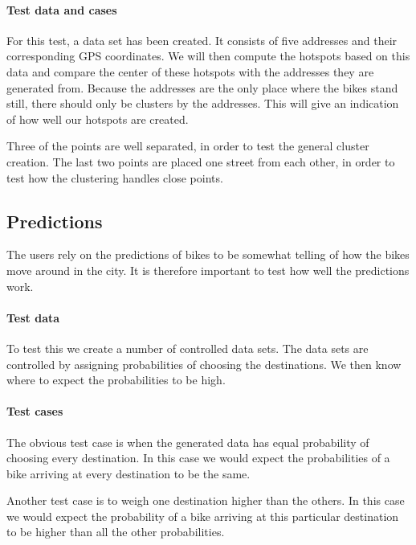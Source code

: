 \paragraph{Test data and cases}
For this test, a data set has been created.
It consists of five addresses and their corresponding GPS coordinates.
We will then compute the hotspots based on this data and compare the center of these hotspots with the addresses they are generated from.
Because the addresses are the only place where the bikes stand still, there should only be clusters by the addresses.
This will give an indication of how well our hotspots are created.

Three of the points are well separated, in order to test the general cluster creation.
The last two points are placed one street from each other, in order to test how the clustering handles close points.

\subsection{Predictions}
The users rely on the predictions of bikes to be somewhat telling of how the bikes move around in the city.
It is therefore important to test how well the predictions work.

\paragraph{Test data} To test this we create a number of controlled data sets.
The data sets are controlled by assigning probabilities of choosing the destinations. 
We then know where to expect the probabilities to be high.

\paragraph{Test cases}
The obvious test case is when the generated data has equal probability of choosing every destination. 
In this case we would expect the probabilities of a bike arriving at every destination to be the same.

Another test case is to weigh one destination higher than the others.
In this case we would expect the probability of a bike arriving at this particular destination to be higher than all the other probabilities.